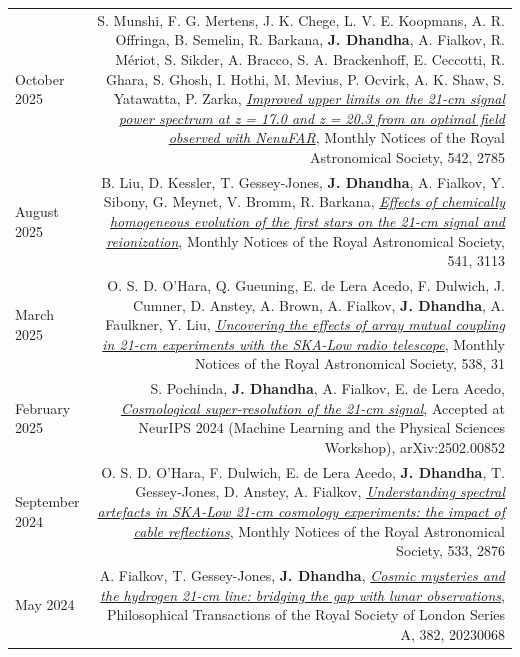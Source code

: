 \documentclass{article}
\begin{document}
\begin{longtable}{L!{\vrule}R}
    October 2025 & S. Munshi, F. G. Mertens, J. K. Chege, L. V. E. Koopmans, A. R. Offringa, B. Semelin, R. Barkana, \textbf{J. Dhandha}, A. Fialkov, R. Mériot, S. Sikder, A. Bracco, S. A. Brackenhoff, E. Ceccotti, R. Ghara, S. Ghosh, I. Hothi, M. Mevius, P. Ocvirk, A. K. Shaw, S. Yatawatta, P. Zarka, \href{https://ui.adsabs.harvard.edu/abs/2025MNRAS.542.2785M}{\textit{Improved upper limits on the 21-cm signal power spectrum at z = 17.0 and z = 20.3 from an optimal field observed with NenuFAR}}, Monthly Notices of the Royal Astronomical Society, 542, 2785 \\

    August 2025 & B. Liu, D. Kessler, T. Gessey-Jones, \textbf{J. Dhandha}, A. Fialkov, Y. Sibony, G. Meynet, V. Bromm, R. Barkana, \href{https://ui.adsabs.harvard.edu/abs/2025MNRAS.541.3113L}{\textit{Effects of chemically homogeneous evolution of the first stars on the 21-cm signal and reionization}}, Monthly Notices of the Royal Astronomical Society, 541, 3113 \\

    March 2025 & O. S. D. O'Hara, Q. Gueuning, E. de Lera Acedo, F. Dulwich, J. Cumner, D. Anstey, A. Brown, A. Fialkov, \textbf{J. Dhandha}, A. Faulkner, Y. Liu, \href{https://ui.adsabs.harvard.edu/abs/2025MNRAS.538...31O}{\textit{Uncovering the effects of array mutual coupling in 21-cm experiments with the SKA-Low radio telescope}}, Monthly Notices of the Royal Astronomical Society, 538, 31 \\

    February 2025 & S. Pochinda, \textbf{J. Dhandha}, A. Fialkov, E. de Lera Acedo, \href{https://ui.adsabs.harvard.edu/abs/2025arXiv250200852P}{\textit{Cosmological super-resolution of the 21-cm signal}}, Accepted at NeurIPS 2024 (Machine Learning and the Physical Sciences Workshop), arXiv:2502.00852 \\

    September 2024 & O. S. D. O'Hara, F. Dulwich, E. de Lera Acedo, \textbf{J. Dhandha}, T. Gessey-Jones, D. Anstey, A. Fialkov, \href{https://ui.adsabs.harvard.edu/abs/2024MNRAS.533.2876O}{\textit{Understanding spectral artefacts in SKA-Low 21-cm cosmology experiments: the impact of cable reflections}}, Monthly Notices of the Royal Astronomical Society, 533, 2876 \\

    May 2024 & A. Fialkov, T. Gessey-Jones, \textbf{J. Dhandha}, \href{https://ui.adsabs.harvard.edu/abs/2024RSPTA.38230068F}{\textit{Cosmic mysteries and the hydrogen 21-cm line: bridging the gap with lunar observations}}, Philosophical Transactions of the Royal Society of London Series A, 382, 20230068 \\


\end{longtable}
\end{document}
